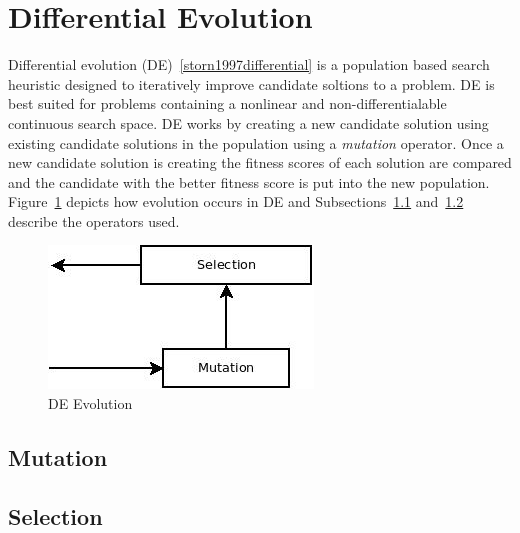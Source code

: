 \section{Differential Evolution}
\label{sec:de}

Differential evolution (DE)~\ref{storn1997differential} is a population based search heuristic designed to iteratively improve candidate soltions to a problem. DE is best suited for problems containing a nonlinear and non-differentialable continuous search space. DE works by creating a new candidate solution using existing candidate solutions in the population using a \textit{mutation} operator. Once a new candidate solution is creating the fitness scores of each solution are compared and the candidate with the better fitness score is put into the new population. Figure~\ref{fig:deFlowchart} depicts how evolution occurs in DE and Subsections~\ref{subsec:de-mutation} and~\ref{subsec:de-selection} describe the operators used.

\begin{figure}[H]
  \centering
  \includegraphics[bb=0 0 266 144,scale=0.5]{figures/DE.jpeg}
  \caption{DE Evolution}
  \label{fig:deFlowchart}
\end{figure}

\subsection{Mutation}
\label{subsec:de-mutation}

\subsection{Selection}
\label{subsec:de-selection}